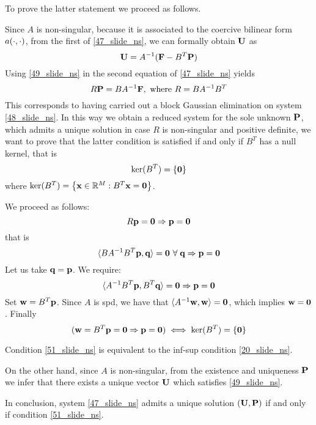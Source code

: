 To prove the latter statement we proceed as follows. 

Since \(A\) is non-singular, because it is associated to the coercive bilinear form \(a(\cdot, \cdot)\), from the first of \eqref{47_slide_ns}, we can formally obtain \(\textbf{U}\) as 
\begin{equation}
    \textbf{U} = A^{-1}(\textbf{F} - B^T\textbf{P})
    \label{49_slide_ns}
\end{equation}
Using \eqref{49_slide_ns} in the second equation of \eqref{47_slide_ns} yields
\begin{equation}
    R\textbf{P} = BA^{-1}\textbf{F}, \text{ where } R=BA^{-1}B^T 
    \label{50_slide_ns}
\end{equation}
This corresponds to having carried out a block Gaussian elimination on system \eqref{48_slide_ns}.
In this way we obtain a reduced system for the sole unknown \(\textbf{P}\), which admits a unique solution in case \(R\) is non-singular and positive definite, we want to prove that the latter condition is satisfied if and only if \(B^T\) has a null kernel, that is 
\begin{equation}
    \ker (B^T) = \left\{ \textbf{0} \right\}
    \label{51_slide_ns}
\end{equation}
where \(\ker (B^T) = \left\{ \textbf{x} \in \mathbb{R}^M : B^T \textbf{x} = \textbf{0} \right\}\). 

We proceed as follows: 
\[
    R\textbf{p} = \textbf{0} \Rightarrow \textbf{p} = \textbf{0}
\]
that is 
\[
    \langle BA^{-1}B^T\textbf{p},\textbf{q} \rangle = \textbf{0} \ \forall \; \textbf{q} \Rightarrow \textbf{p} = \textbf{0}
\]
Let us take \(\textbf{q} = \textbf{p}\). We require:
\[
    \langle A^{-1}B^T \textbf{p},B^T\textbf{q} \rangle = \textbf{0} \Rightarrow \textbf{p} = \textbf{0}
\]
Set \(\textbf{w} = B^T \textbf{p}\). Since \(A\) is spd, we have that \(\langle A^{-1}\textbf{w},\textbf{w} \rangle = \textbf{0}\), which implies \(\textbf{w} = \textbf{0}\). Finally
\[
    (\textbf{w} = B^T \textbf{p} = \textbf{0} \Rightarrow \textbf{p} = \textbf{0}) \iff \ker (B^T) =  \left\{ \textbf{0} \right\}
\]
\begin{remark}
    Condition \eqref{51_slide_ns} is equivalent to the inf-sup condition \eqref{20_slide_ns}.
\end{remark}
On the other hand, since \(A\) is non-singular, from the existence and uniqueness \(\textbf{P}\) we infer that there exists a unique vector \(\textbf{U}\) which satisfies \eqref{49_slide_ns}. 

In conclusion, system \eqref{47_slide_ns} admits a unique solution \((\textbf{U}, \textbf{P})\) if and only if condition \eqref{51_slide_ns}. 


